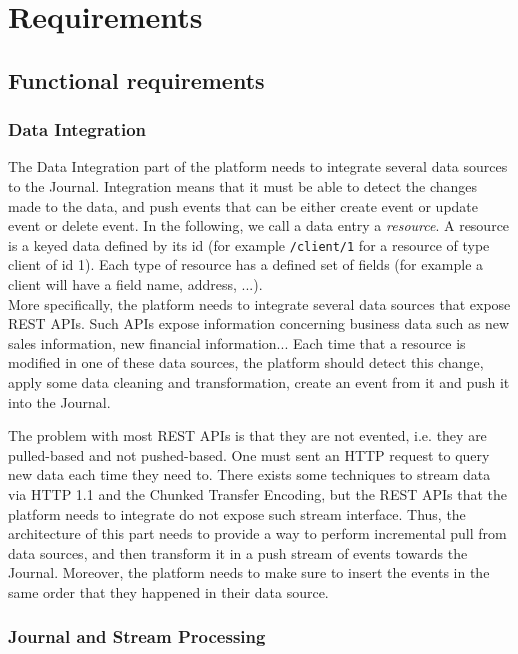 \chapter{Requirements}

\section{Functional requirements}

\subsection{Data Integration}

The Data Integration part of the platform needs to integrate several data sources to the Journal. Integration means that it must be able 
to detect the changes made to the data, and push events that can be either create event or update event or delete event.
In the following, we call a data entry a \textit{resource}. A resource is a keyed data defined by its id (for example \verb|/client/1| for a
resource of type client of id 1). Each type of resource has a defined set of fields (for example a client
will have a field name, address, ...).
\\

More specifically, the platform needs to integrate several data sources that expose REST APIs. Such APIs expose information
concerning business data such as new sales information, new financial information...
Each time that a resource is modified in one of these data sources, the platform should detect this change, apply some data cleaning and transformation, create an 
event from it and push it into the Journal.

The problem with most REST APIs is that they are not evented, i.e. they are pulled-based and not pushed-based. 
One must sent an HTTP request to query new data each time they need to. There exists some techniques to stream data via HTTP 1.1 and the 
Chunked Transfer Encoding, but the REST APIs that the platform needs to integrate do not expose such stream interface. 
Thus, the architecture of this part needs to provide a way to perform incremental pull from data sources, and then transform
it in a push stream of events towards the Journal. Moreover, the platform needs to make sure to insert the events in the same
order that they happened in their data source.


\subsection{Journal and Stream Processing}

